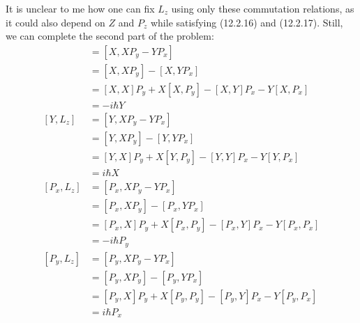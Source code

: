 \documentclass[../principles-of-quantum-mechanics.tex]{subfiles}
\begin{document}
\begin{questions}
	\begin{solution}
		It is unclear to me how one can fix $L_z$ using only these commutation relations, as it could also depend on $Z$ and $P_z$ while satisfying (12.2.16) and (12.2.17). Still, we can complete the second part of the problem:
		\begin{align*}
			[X, L_z] &= [X, XP_y - YP_x] \\ 
			&= [X, XP_y] - [X, YP_x] \\
			&= [X, X]P_y + X[X, P_y] - [X, Y]P_x - Y[X, P_x] \\
			&= {-i\hbar}Y \\
			[Y, L_z] &= [Y, XP_y - YP_x] \\
			&= [Y, XP_y] - [Y, YP_x] \\
			&= [Y, X]P_y + X[Y, P_y] - [Y, Y]P_x - Y[Y, P_x] \\
			&= i\hbar X \\
			[P_x, L_z] &= [P_x, XP_y - YP_x] \\
			&= [P_x, XP_y] - [P_x, YP_x] \\
			&= [P_x, X]P_y + X[P_x, P_y] - [P_x, Y]P_x - Y[P_x, P_x] \\
			&= {-i\hbar}P_y \\
			[P_y, L_z] &= [P_y, XP_y - YP_x] \\
			&= [P_y, XP_y] - [P_y, YP_x] \\
			&= [P_y, X]P_y + X[P_y, P_y] - [P_y, Y]P_x - Y[P_y, P_x] \\
			&= i\hbar P_x
		\end{align*}
	\end{solution}
	

\end{questions}
\end{document}
